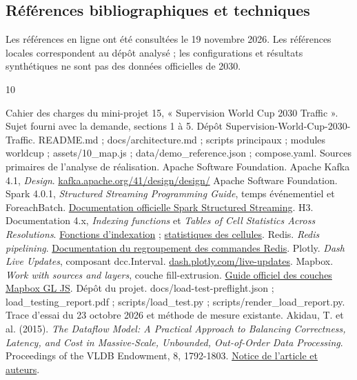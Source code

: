 \documentclass[a4paper,11pt]{article}
\begin{document}
\subsection{Références bibliographiques et techniques}
{\small Les références en ligne ont été consultées le 19 novembre 2026. Les références locales correspondent au dépôt analysé ; les configurations et résultats synthétiques ne sont pas des données officielles de 2030.\par}
\begingroup
\fontsize{9.1}{11.1}\selectfont
\renewcommand{\section}[2]{}
\begin{thebibliography}{10}
\raggedright
\setlength{\itemsep}{3pt}
\setlength{\parskip}{0pt}
 Cahier des charges du mini-projet 15, « Supervision World Cup 2030 Traffic ». Sujet fourni avec la demande, sections 1 à 5.
 Dépôt Supervision-World-Cup-2030-Traffic. README.md ; docs/architecture.md ; scripts principaux ; modules worldcup ; assets/10\_map.js ; data/demo\_reference.json ; compose.yaml. Sources primaires de l'analyse de réalisation.
 Apache Software Foundation. Apache Kafka 4.1, \emph{Design}. \href{https://kafka.apache.org/41/design/design/}{kafka.apache.org/41/design/design/}
 Apache Software Foundation. Spark 4.0.1, \emph{Structured Streaming Programming Guide}, temps événementiel et ForeachBatch. \href{https://spark.apache.org/docs/4.0.1/streaming/apis-on-dataframes-and-datasets.html}{Documentation officielle Spark Structured Streaming}.
 H3. Documentation 4.x, \emph{Indexing functions} et \emph{Tables of Cell Statistics Across Resolutions}. \href{https://h3geo.org/docs/api/indexing/}{Fonctions d'indexation} ; \href{https://h3geo.org/docs/core-library/restable/}{statistiques des cellules}.
 Redis. \emph{Redis pipelining}. \href{https://redis.io/docs/latest/develop/using-commands/pipelining/}{Documentation du regroupement des commandes Redis}.
 Plotly. \emph{Dash Live Updates}, composant dcc.Interval. \href{https://dash.plotly.com/live-updates}{dash.plotly.com/live-updates}.
 Mapbox. \emph{Work with sources and layers}, couche fill-extrusion. \href{https://docs.mapbox.com/mapbox-gl-js/guides/styles/work-with-layers/}{Guide officiel des couches Mapbox GL JS}.
 Dépôt du projet. docs/load-test-preflight.json ; load\_testing\_report.pdf ; scripts/load\_test.py ; scripts/render\_load\_report.py. Trace d'essai du 23 octobre 2026 et méthode de mesure existante.
 Akidau, T. et al. (2015). \emph{The Dataflow Model: A Practical Approach to Balancing Correctness, Latency, and Cost in Massive-Scale, Unbounded, Out-of-Order Data Processing}. Proceedings of the VLDB Endowment, 8, 1792-1803. \href{https://research.google/pubs/the-dataflow-model-a-practical-approach-to-balancing-correctness-latency-and-cost-in-massive-scale-unbounded-out-of-order-data-processing/}{Notice de l'article et auteurs}.
\end{thebibliography}
\endgroup
\end{document}

